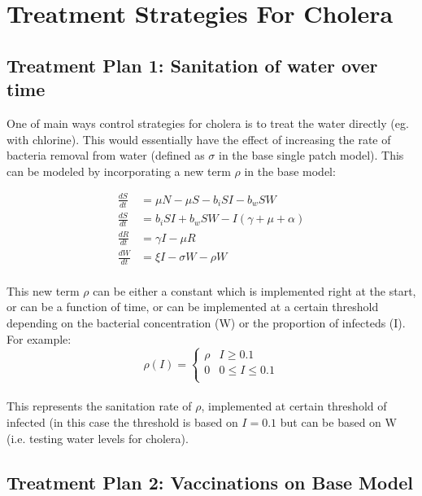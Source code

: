 \documentclass[12pt]{article}\usepackage[]{graphicx}\usepackage[]{color}
\begin{document}
\section{Treatment Strategies For Cholera}

\subsection{Treatment Plan 1: Sanitation of water over time}
One of main ways control strategies for cholera is to treat the water directly (eg. with chlorine). This would essentially have the effect of increasing the rate of bacteria removal from water (defined as $\sigma$ in the base single patch model). This can be modeled by incorporating a new term $\rho$ in the base model:
\begin{linenomath}
\begin{align*}
	\frac{dS}{dt}&= \mu N - \mu S - b_i SI - b_w S W  \\
	\frac{dS}{dt}&= b_i S I + b_w S W - I (\gamma + \mu + \alpha) \\
	\frac{dR}{dt}&= \gamma I - \mu R \\
	\frac{dW}{dt}&= \xi I  - \sigma W - \rho W\\
\end{align*}
\end{linenomath}

This new term $\rho$ can be either a constant which is implemented right at the start, or can be a function of time, or can be implemented at a certain threshold depending on the bacterial concentration (W) or the proportion of infecteds (I). For example:
$$\rho (I)= \begin{cases}
	\rho & I \geq 0.1 \\
	0 & 0 \leq I \leq 0.1 \\
	\end{cases}$$\\
This represents the sanitation rate of $\rho$, implemented at certain threshold of infected (in this case the threshold is based on $I=0.1$ but can be based on W (i.e. testing water levels for cholera).\\


\subsection{Treatment Plan 2: Vaccinations on Base Model}
\end{document}
